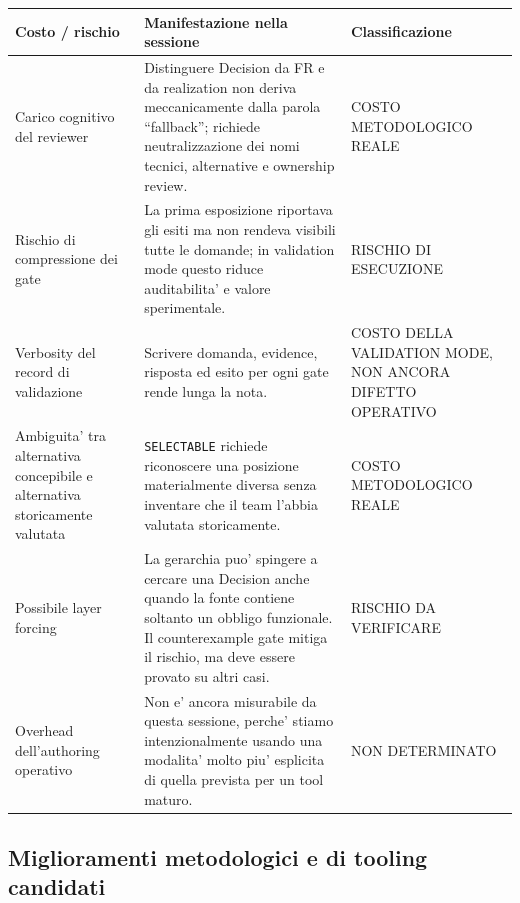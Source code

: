 \documentclass[11pt,a4paper]{article}
\begin{document}
\begin{tabularx}{\textwidth}{L{42mm}Y L{25mm}}
\toprule
\textbf{Costo / rischio} & \textbf{Manifestazione nella sessione} & \textbf{Classificazione} \\
\midrule
Carico cognitivo del reviewer & Distinguere Decision da FR e da realization non deriva meccanicamente dalla parola ``fallback''; richiede neutralizzazione dei nomi tecnici, alternative e ownership review. & COSTO METODOLOGICO REALE \\
Rischio di compressione dei gate & La prima esposizione riportava gli esiti ma non rendeva visibili tutte le domande; in validation mode questo riduce auditabilita' e valore sperimentale. & RISCHIO DI ESECUZIONE \\
Verbosity del record di validazione & Scrivere domanda, evidence, risposta ed esito per ogni gate rende lunga la nota. & COSTO DELLA VALIDATION MODE, NON ANCORA DIFETTO OPERATIVO \\
Ambiguita' tra alternativa concepibile e alternativa storicamente valutata & \texttt{SELECTABLE} richiede riconoscere una posizione materialmente diversa senza inventare che il team l'abbia valutata storicamente. & COSTO METODOLOGICO REALE \\
Possibile layer forcing & La gerarchia puo' spingere a cercare una Decision anche quando la fonte contiene soltanto un obbligo funzionale. Il counterexample gate mitiga il rischio, ma deve essere provato su altri casi. & RISCHIO DA VERIFICARE \\
Overhead dell'authoring operativo & Non e' ancora misurabile da questa sessione, perche' stiamo intenzionalmente usando una modalita' molto piu' esplicita di quella prevista per un tool maturo. & NON DETERMINATO \\
\bottomrule
\end{tabularx}

\subsection{Miglioramenti metodologici e di tooling candidati}
\end{document}
